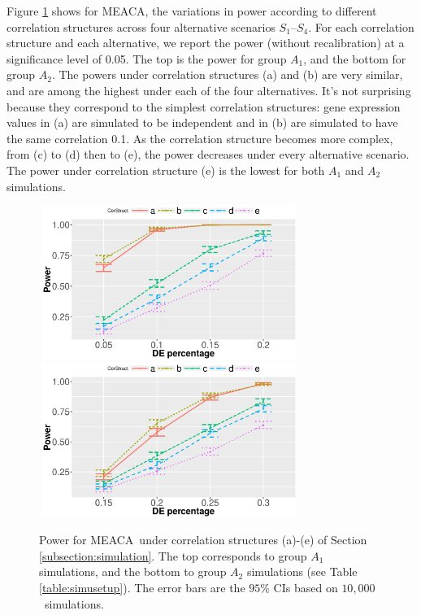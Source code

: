 \documentclass[a4,center,fleqn]{NAR}
\newcommand{\OurMethod}{MEACA}
\newcommand{\aaCase}{a}
\newcommand{\aCase}{c}
\newcommand{\cCase}{b}
\newcommand{\eCase}{d}
\newcommand{\fCase}{e}
\newcommand{\HowmanySimu}{$10,000$}
\begin{document}
	Figure \ref{fig:power} shows for \OurMethod, the variations in power according to different
	correlation structures across four alternative scenarios $S_1$--$S_4$. For each correlation 
	structure and each alternative, we report the power (without recalibration) at a significance 
	level of 0.05. The top is the power for group $A_1$, and the bottom for group $A_2$.  The 
	powers under correlation structures (\aaCase) and (\cCase) are very similar, and are among the 
	highest under each of the four alternatives. It's not surprising because they correspond to the 
	simplest correlation structures: gene expression values in (\aaCase) are simulated to be 
	independent and in (\cCase) are simulated to have the same correlation 0.1. As the correlation 
	structure becomes more complex, from (\aCase) to (\eCase) then
	to (\fCase), the power decreases under every alternative scenario. The power under correlation
	structure (\fCase) is the lowest for both $A_1$ and $A_2$ simulations.%
	
	\begin{figure}[!ht]
		\centering
		\includegraphics[width=8.5cm,height=5cm]{Figures/powerA1pct.eps}
		\includegraphics[width=8.5cm,height=5cm]{Figures/powerA2pct.eps}
		\caption[Power for \OurMethod~under correlation structures (\aaCase)-(\fCase)]{Power for 
			\OurMethod~under correlation structures (\aaCase)-(\fCase) of Section
			\ref{subsection:simulation}. The top corresponds to group $A_1$ simulations, and the 
			bottom to group
			$A_2$ simulations (see Table \ref{table:simusetup}). The error bars are the $95\%$ CIs 
			based on
			\HowmanySimu~simulations. }\label{fig:power}
	\end{figure} 
\end{document}
